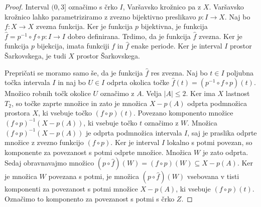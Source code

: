 \documentclass[../TG_magistrsko_delo_sections.tex]{subfiles}
\begin{document}
\begin{proof}
Interval $(0, 3]$ označimo s črko $I$, Varšavsko krožnico pa z $X$. Varšavsko krožnico lahko parametriziramo z zvezno bijektivno preslikavo $p:I \to X$. Naj bo $f: X \to X$ zvezna funkcija. Ker je funkcija $p$ bijektivna, je funkcija $\widehat{f} = p^{-1} \circ f \circ p : I \to I$ dobro definirana. Trdimo, da je funkcija $\widehat{f}$ zvezna. Ker je funkcija $p$ bijekcija, imata funkciji $f$ in $\widehat{f}$ enake periode. Ker je interval $I$ prostor Šarkovskega, je tudi $X$ prostor Šarkovskega. 

Prepričati se moramo samo še, da je funkcija $\widehat{f}$ res zvezna. Naj bo $t \in I$ poljubna točka intervala $I$ in naj bo $U \in I$ odprta okolica točke $\widehat{f}(t) = (p^{-1} \circ f \circ p)(t)$. Množico robnih točk okolice $U$ označimo z $A$. Velja $|A| \leq 2$. Ker ima $X$ lastnost $T_2$, so točke zaprte množice in zato je množica $X - p(A)$ odprta podmnožica prostora $X$, ki vsebuje točko $(f \circ p)(t)$. Povezano komponento množice $(f \circ p)^{-1}(X-p(A))$, ki vsebuje točko $t$ označimo z $W$. Množica $(f \circ p)^{-1}(X-p(A))$ je odprta podmnožica intervala $I$, saj je praslika odprte množice z zvezno funkcijo $(f \circ p)$. Ker je interval $I$ lokalno s potmi povezan, so komponente za povezanost s potmi odprte množice. Množica $W$ je zato odprta. Sedaj obravnavajmo množico $\left(p \circ \widehat{f}\right) (W) = (f \circ p)(W) \subseteq X - p(A)$. Ker je množica $W$ povezana s potmi, je množica $\left(p \circ \widehat{f} \right) (W)$ vsebovana v tisti komponenti za povezanost s potmi množice $X-p(A)$, ki vsebuje $(f \circ p)(t)$. Označimo to komponento za povezanost s potmi s črko $Z$. 


\end{proof}
\end{document}
